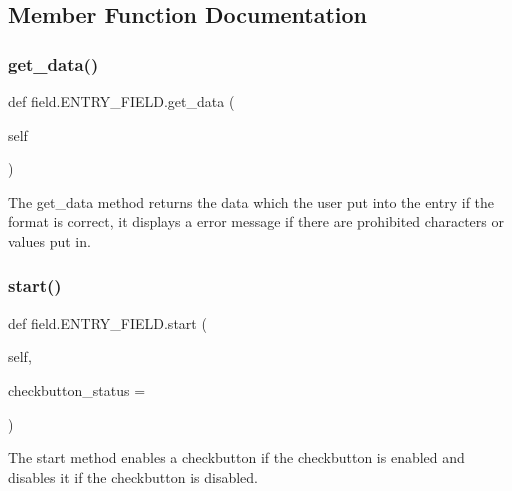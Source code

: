 \subsection{Member Function Documentation}
\mbox{\label{classfield_1_1ENTRY__FIELD_a507d037b7c07b2da5c7d344e20d32fac}} 
\subsubsection{\texorpdfstring{get\+\_\+data()}{get\_data()}}
{\footnotesize\ttfamily def field.\+E\+N\+T\+R\+Y\+\_\+\+F\+I\+E\+L\+D.\+get\+\_\+data (\begin{DoxyParamCaption}\item[{}]{self }\end{DoxyParamCaption})}



The get\+\_\+data method returns the data which the user put into the entry if the format is correct, it displays a error message if there are prohibited characters or values put in. 

\mbox{\label{classfield_1_1ENTRY__FIELD_ae2e9fcabf60c2a2865bff3de226e97a3}} 
\subsubsection{\texorpdfstring{start()}{start()}}
{\footnotesize\ttfamily def field.\+E\+N\+T\+R\+Y\+\_\+\+F\+I\+E\+L\+D.\+start (\begin{DoxyParamCaption}\item[{}]{self,  }\item[{}]{checkbutton\+\_\+status = {} }\end{DoxyParamCaption})}



The start method enables a checkbutton if the checkbutton is enabled and disables it if the checkbutton is disabled. 

\mbox{\label{classfield_1_1ENTRY__FIELD_ad87b69becbcd6dd90bd3854e53a72195}} 
